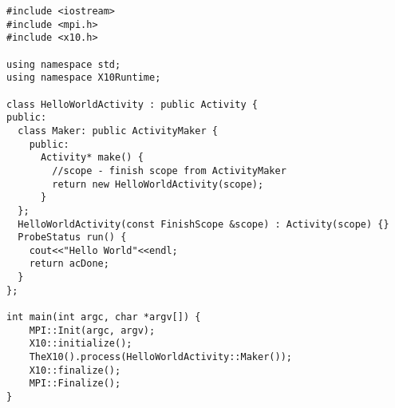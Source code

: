 
\begin{verbatim}
#include <iostream>
#include <mpi.h>
#include <x10.h>

using namespace std;
using namespace X10Runtime;

class HelloWorldActivity : public Activity {
public:
  class Maker: public ActivityMaker {
    public:
      Activity* make() {
        //scope - finish scope from ActivityMaker
        return new HelloWorldActivity(scope); 
      }
  };
  HelloWorldActivity(const FinishScope &scope) : Activity(scope) {}
  ProbeStatus run() { 
    cout<<"Hello World"<<endl; 
    return acDone; 
  }
};

int main(int argc, char *argv[]) {
    MPI::Init(argc, argv);
    X10::initialize();
    TheX10().process(HelloWorldActivity::Maker());
    X10::finalize();
    MPI::Finalize();
}
\end{verbatim}
